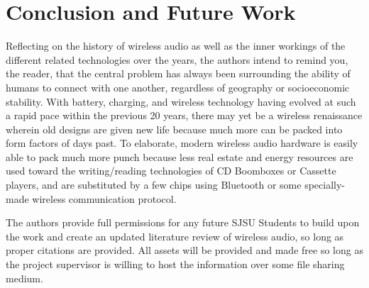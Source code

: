 \documentclass[conference]{IEEEtran}
\begin{document}
\section*{Conclusion and Future Work}

Reflecting on the history of wireless audio as well as the inner workings of the different
related technologies over the years, the authors intend to remind you, the reader, that the
central problem has always been surrounding the ability of humans to connect with one
another, regardless of geography or socioeconomic stability. With battery, charging, and
wireless technology having evolved at such a rapid pace within the previous 20 years, there
may yet be a wireless renaissance wherein old designs are given new life because much more
can be packed into form factors of days past. To elaborate, modern wireless audio hardware is
easily able to pack much more punch because less real estate and energy resources are used
toward the writing/reading technologies of CD Boomboxes or Cassette players, and are
substituted by a few chips using Bluetooth or some specially-made wireless communication
protocol.

The authors provide full permissions for any future SJSU Students to build upon the work and
create an updated literature review of wireless audio, so long as proper citations are
provided. All assets will be provided and made free so long as the project supervisor is
willing to host the information over some file sharing medium.

\vfill



\vspace{12pt}
\end{document}

